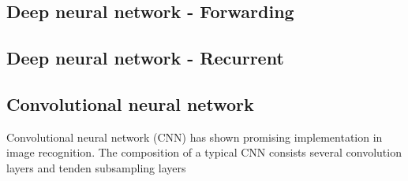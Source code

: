 \subsection{Deep neural network - Forwarding}
\subsection{Deep neural network - Recurrent}
\subsection{Convolutional neural network}
Convolutional neural network (CNN) has shown promising implementation in image recognition. The composition of a typical CNN consists several convolution layers and tenden subsampling layers